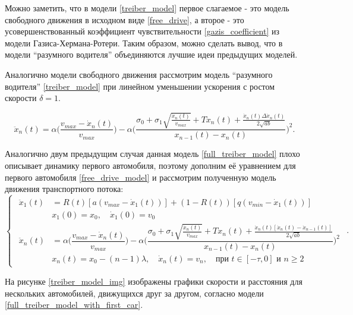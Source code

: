 \documentclass[12pt, a4paper]{extarticle}
\numberwithin{equation}{section}
\begin{document}
Можно заметить, что в модели \eqref{treiber_model} первое слагаемое - это модель свободного движения в исходном виде \eqref{free_drive}, а второе - это усовершенствованный коэффициент чувствительности \eqref{gazis_coefficient} из модели Газиса-Хермана-Ротери. Таким образом, можно сделать вывод, что в модели ``разумного водителя'' объединяются лучшие идеи предыдущих моделей.

Аналогично модели свободного движения рассмотрим модель ``разумного водителя'' \eqref{treiber_model} при линейном уменьшении ускорения с ростом скорости $\delta=1$.

\begin{equation} \label{full_treiber_model}
\ddot{x}_n(t)= \alpha\bigg(\dfrac{v_{max}-\dot{x}_n(t)}{v_{max}} \bigg) - \alpha\bigg( \dfrac{\sigma_0+\sigma_1\sqrt{\frac{ \dot{x}_n(t)}{v_{max}}} +T \dot{x}_n(t)+ \frac{ \dot{x}_n(t)\Delta \dot{x}_n(t) }{2\sqrt{ab}}}{x_{n-1}(t)-x_n(t)}\bigg)^2.
\end{equation}

Аналогично двум предыдущим случая данная модель \eqref{full_treiber_model} плохо описывает динамику первого автомобиля, поэтому дополним её уравнением для первого автомобиля \eqref{free_drive_model} и рассмотрим полученную модель движения транспортного потока:
\begin{equation} \label{full_treiber_model_with_first_car} 
\begin{cases}
\begin{split}
\ddot{x}_1(t)& = R(t) \left[ a\left(v_{max}-\dot{x}_1(t) \right)\right] + (1-R(t)) \left[ q\left( v_{min} - \dot{x}_1(t)\right) \right] \\
&x_{1}(0)=x_0, \quad \dot{x}_{1}(0)=v_{0}\\
\ddot{x}_n(t)& = \alpha\bigg(\dfrac{v_{max}-\dot{x}_n(t)}{v_{max}} \bigg) - \alpha\bigg( \dfrac{\sigma_0+\sigma_1\sqrt{\frac{ \dot{x}_n(t)}{v_{max}}} +T \dot{x}_n(t)+ \frac{ \dot{x}_n(t)\left[ \dot{x}_n(t)-\dot{x}_{n-1}(t)\right]  }{2\sqrt{ab}}}{x_{n-1}(t)-x_n(t)}\bigg)^2 \\
&x_n(t)=x_0-(n-1)\lambda, \quad \dot{x}_n(t)=v_{n}, \quad \text{при } t \in [-\tau,0] \text{ и } n\geq2
\end{split}
\end{cases}.
\end{equation}

На рисунке \eqref{treiber_model_img} изображены графики скорости и расстояния для нескольких автомобилей, движущихся друг за другом, согласно модели \eqref{full_treiber_model_with_first_car}.
\end{document}
